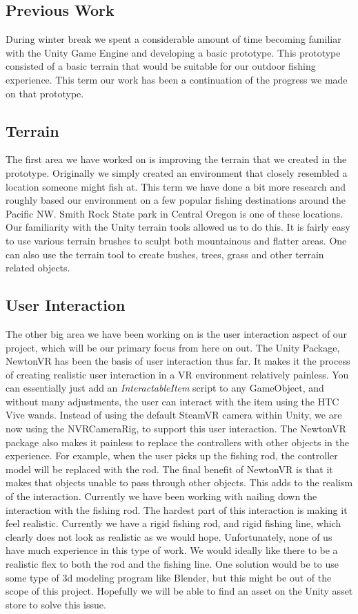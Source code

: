 \documentclass[10pt,journal,compsoc,onecolumn, draftclsnofoot]{IEEEtran}
\begin{document}
\subsection{Previous Work}
During winter break we spent a considerable amount of time becoming familiar with the Unity Game Engine and developing a basic prototype.
This prototype consisted of a basic terrain that would be suitable for our outdoor fishing experience.
This term our work has been a continuation of the progress we made on that prototype.

\subsection{Terrain}
The first area we have worked on is improving the terrain that we created in the prototype.
Originally we simply created an environment that closely resembled a location someone might fish at.
This term we have done a bit more research and roughly based our environment on a few popular fishing destinations around the Pacific NW.
Smith Rock State park in Central Oregon is one of these locations.
Our familiarity with the Unity terrain tools allowed us to do this.
It is fairly easy to use various terrain brushes to sculpt both mountainous and flatter areas.
One can also use the terrain tool to create bushes, trees, grass and other terrain related objects.

\subsection{User Interaction}
The other big area we have been working on is the user interaction aspect of our project, which will be our primary focus from here on out.
The Unity Package, NewtonVR has been the basis of user interaction thus far.
It makes it the process of creating realistic user interaction in a VR environment relatively painless.
You can essentially just add an \textit{InteractableItem} script to any GameObject, and without many adjustments, the user can interact with the item using the HTC Vive wands.
Instead of using the default SteamVR camera within Unity, we are now using the NVRCameraRig, to support this user interaction.
The NewtonVR package also makes it painless to replace the controllers with other objects in the experience.
For example, when the user picks up the fishing rod, the controller model will be replaced with the rod.
The final benefit of NewtonVR is that it makes that objects unable to pass through other objects.
This adds to the realism of the interaction.
Currently we have been working with nailing down the interaction with the fishing rod.
The hardest part of this interaction is making it feel realistic.
Currently we have a rigid fishing rod, and rigid fishing line, which clearly does not look as realistic as we would hope.
Unfortunately, none of us have much experience in this type of work.
We would ideally like there to be a realistic flex to both the rod and the fishing line.
One solution would be to use some type of 3d modeling program like Blender, but this might be out of the scope of this project.
Hopefully we will be able to find an asset on the Unity asset store to solve this issue.
\end{document}
